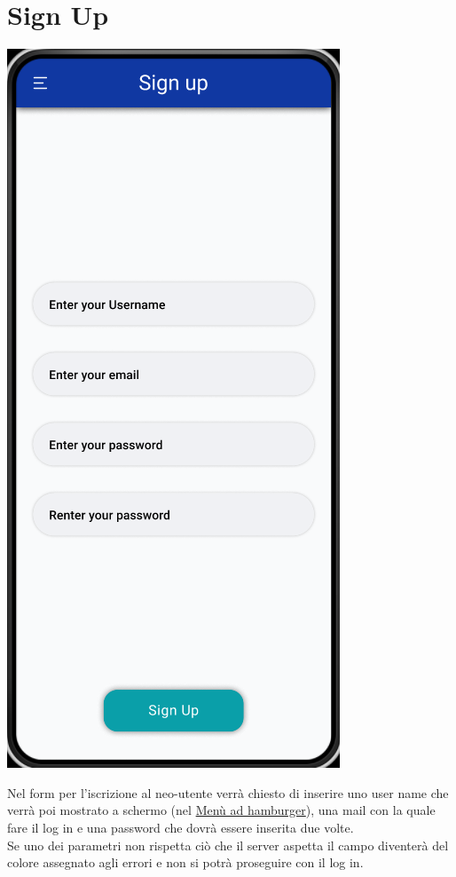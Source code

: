 \documentclass{report}
\begin{document}
\section{Sign Up}

\begin{center}
   \includegraphics[scale=0.4]{sign_up.png}
\end{center}

Nel form per l'iscrizione al neo-utente verrà chiesto di inserire uno user name che verrà poi mostrato a schermo (nel \hyperref[sec:hamburger]{Menù ad hamburger}), una mail con la quale fare il log in e una password che dovrà essere inserita due volte.\\
Se uno dei parametri non rispetta ciò che il server aspetta il campo diventerà del colore assegnato agli errori e non si potrà proseguire con il log in.

\printbibliography
\end{document}
